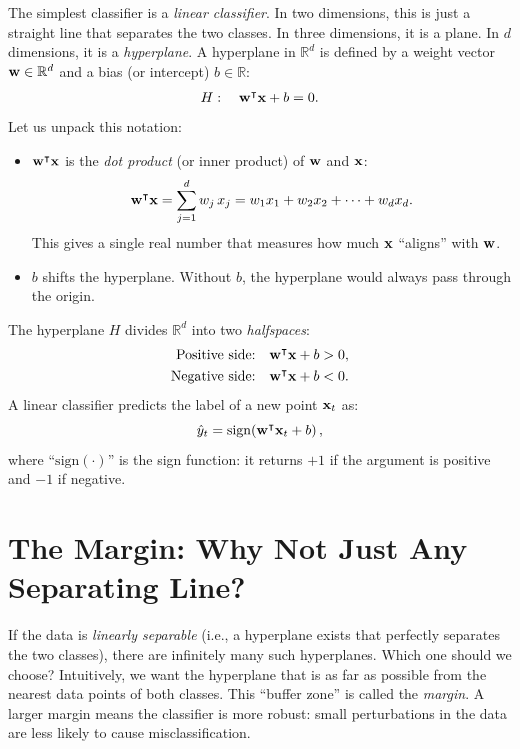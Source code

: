 \documentclass[11pt, letterpaper]{article}
\newcommand{\R}{\mathbb{R}}
\begin{document}
The simplest classifier is a \emph{linear classifier}. In two dimensions, this is just a straight line that separates the two classes. In three dimensions, it is a plane. In $d$ dimensions, it is a \emph{hyperplane}. A hyperplane in $\R^d$ is defined by a weight vector $\vb{w} \in \R^d$ and a bias (or intercept) $b \in \R$:
\begin{equation}
    H : \quad \vb{w}^{\intercal} \vb{x} + b = 0.
\end{equation}
Let us unpack this notation:
\begin{itemize}[leftmargin=2em]
    \item $\vb{w}^{\intercal} \vb{x}$ is the \emph{dot product} (or inner product) of $\vb{w}$ and $\vb{x}$:
    \begin{equation}
        \vb{w}^{\intercal} \vb{x} = \sum_{j=1}^{d} w_j\, x_j = w_1 x_1 + w_2 x_2 + \cdots + w_d x_d.
    \end{equation}
    This gives a single real number that measures how much $\vb{x}$ ``aligns'' with $\vb{w}$.
    \item $b$ shifts the hyperplane. Without $b$, the hyperplane would always pass through the origin.
\end{itemize}
The hyperplane $H$ divides $\R^d$ into two \emph{halfspaces}:
\begin{align}
    \text{Positive side:} &\quad \vb{w}^{\intercal} \vb{x} + b > 0, \\
    \text{Negative side:} &\quad \vb{w}^{\intercal} \vb{x} + b < 0.
\end{align}
A linear classifier predicts the label of a new point $\vb{x}_t$ as:
\begin{equation}
    \hat{y}_t = \mathrm{sign}\!\left(\vb{w}^{\intercal} \vb{x}_t + b\right),
\end{equation}
where ``$\mathrm{sign}(\cdot)$'' is the sign function: it returns $+1$ if the argument is positive and $-1$ if negative.

\section{The Margin: Why Not Just Any Separating Line?}

If the data is \emph{linearly separable} (i.e., a hyperplane exists that perfectly separates the two classes), there are infinitely many such hyperplanes. Which one should we choose? Intuitively, we want the hyperplane that is as far as possible from the nearest data points of both classes. This ``buffer zone'' is called the \emph{margin}. A larger margin means the classifier is more robust: small perturbations in the data are less likely to cause misclassification.
\end{document}
